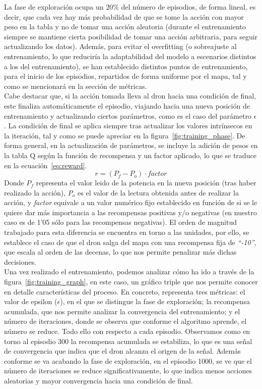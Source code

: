 La fase de exploración ocupa un 20\% del número de episodios, de forma lineal, es decir, que cada vez hay más probabilidad de que se tome la acción con mayor peso en la tabla y no de tomar una acción aleatoria (durante el entrenamiento siempre se mantiene cierta posibilidad de tomar una acción arbitraria, para seguir actualizando los datos). Además, para evitar el overfitting (o sobreajuste al entrenamiento, lo que reduciría la adaptabilidad del modelo a escenarios distintos a los del entrenamiento), se han establecido distintos puntos de entrenamiento, para el inicio de los episodios, repartidos de forma uniforme por el mapa, tal y como se mencionará en la sección de métricas.\\

Cabe destacar que, si la acción tomada lleva al dron hacia una condición de final, este finaliza automáticamente el episodio, viajando hacia una nueva posición de entrenamiento y actualizando ciertos parámetros, como es el caso  del parámetro $\epsilon$. La condición de final se aplica siempre tras actualizar los valores intrínsecos en la iteración, tal y como se puede apreciar en la figura~\ref{fig:training_phase}. De forma general, en la actualización de parámetros, se incluye la adición de pesos en la tabla Q según la función de recompensa y un factor aplicado, lo que se traduce en la ecuación~\ref{eq:reward}.
\begin{equation}
    r = (P_f - P_o) \cdot factor
    \label{eq:reward}
\end{equation}
Donde $P_f$ representa el valor leido de la potencia en la nueva posición (tras haber realizado la acción), $P_o$ es el valor de la lectura obtenida antes de realizar la acción, y \emph{factor} equivale a un valor numérico fijo establecido en función de si se le quiere dar más importancia a las recompensas positivas y/o negativas (en nuestro caso es de 1'05 sólo para las recompensas negativas). El orden de magnitud trabajado para esta diferencia se encuentra en torno a las unidades, por ello, se establece el caso de que el dron salga del mapa con una recompensa fija de \emph{``-10''}, que escala al orden de las decenas, lo que nos permite penalizar más dichas decisiones.\\

Una vez realizado el entrenamiento, podemos analizar cómo ha ido a través de la figura~\ref{fig:training_graph}, en este caso, un gráfico triple que nos permite conocer en detalle características del proceso. En concreto, representa tres métricas: el valor de epsilon ($\epsilon$), en el que se distingue la fase de exploración; la recompensa acumulada, que nos permite analizar la convergencia del entrenamiento; y el número de iteraciones, donde se observa que conforme el algoritmo aprende, el número se reduce. Todo ello con respecto a cada episodio. Observamos como en torno al episodio 300 la recompensa acumulada se estabiliza, lo que es una señal de convergencia que indica que el dron alcanza el origen de la señal. Además conforme se va acabando la fase de exploración, en el episodio 1000, se ve que el número de iteraciones se reduce significativamente, lo que indica menos acciones aleatorias y mayor convergencia hacia una condición de final.\\

